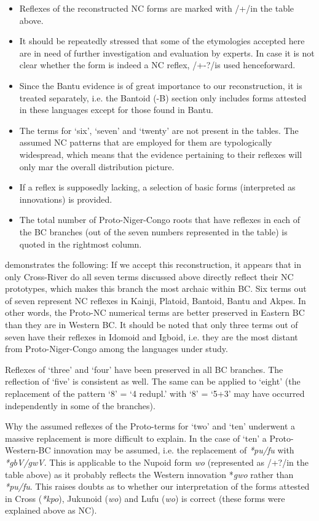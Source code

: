 \begin{itemize}
\item  Reflexes of the reconstructed NC forms are marked with /+/in the table above. 
\item  It should be repeatedly stressed that some of the etymologies accepted here are in need of further investigation and evaluation by experts. In case it is not clear whether the form is indeed a NC reflex, /+-?/is used henceforward.
\item  Since the Bantu evidence is of great importance to our reconstruction, it is treated separately, i.e. the Bantoid (-B) section only includes forms attested in these languages except for those found in Bantu.
\item  The terms for ‘six’, ‘seven’ and ‘twenty’ are not present in the tables. The assumed NC patterns that are employed for them are typologically widespread, which means that the evidence pertaining to their reflexes will only mar the overall distribution picture.
\item  If a reflex is supposedly lacking, a selection of basic forms (interpreted as innovations) is provided.
\item  The total number of Proto-Niger-Congo roots that have reflexes in each of the BC branches (out of the seven numbers represented in the table) is quoted in the rightmost column.
\end{itemize} 

 demonstrates the following:
If we accept this reconstruction, it appears that in only Cross-River do all seven terms discussed above directly reflect their NC prototypes, which makes this branch the most archaic within BC. Six terms out of seven represent NC reflexes in Kainji, Platoid, Bantoid, Bantu and Akpes. In other words, the Proto-NC numerical terms are better preserved in Eastern BC than they are in Western BC. It should be noted that only three terms out of seven have their reflexes in Idomoid and Igboid, i.e. they are the most distant from Proto-Niger-Congo among the languages under study.

Reflexes of ‘three’ and ‘four’ have been preserved in all BC branches. The reflection of ‘five’ is consistent as well. The same can be applied to ‘eight’ (the replacement of the pattern ‘8’ = ‘4 redupl.’ with ‘8’ = ‘5+3’ may have occurred independently in some of the branches).

Why the assumed reflexes of the Proto-terms for ‘two’ and ‘ten’ underwent a massive replacement is more difficult to explain. In the case of ‘ten’ a Proto-Western-BC innovation may be assumed, i.e. the replacement of \textit{*pu}\textit{/fu} with \textit{*gbV}\textit{/gwV}. This is applicable to the Nupoid form \textit{wo} (represented as /+?/in the table above) as it probably reflects the Western innovation *\textit{gwo} rather than \textit{*pu}\textit{/fu}. This raises doubts as to whether our interpretation of the forms attested in Cross (\textit{*kpo}), Jukunoid (\textit{wo}) and Lufu (\textit{wo}) is correct (these forms were explained above as NC). 

